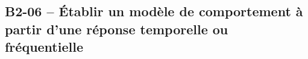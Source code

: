 \subsection{B2-06 -- Établir un modèle de comportement à partir d'une réponse temporelle ou fréquentielle}

\renewcommand{\repExo}{../../ExercicesCompetences/B2_ProposerModele/B2_06_ModeleComportement}

\renewcommand{\td}{502_Divers}
\graphicspath{{\repStyle/png/}{\repExo/\td/images/}}


\renewcommand{\td}{503_Divers}
\graphicspath{{\repStyle/png/}{\repExo/\td/images/}}


\renewcommand{\td}{504_Divers}
\graphicspath{{\repStyle/png/}{\repExo/\td/images/}}


\renewcommand{\td}{506_Divers}
\graphicspath{{\repStyle/png/}{\repExo/\td/images/}}



